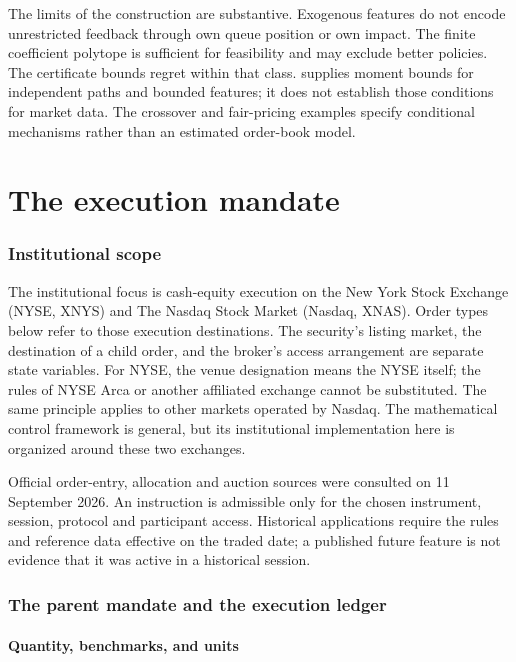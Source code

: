 \documentclass[11pt]{article}
\numberwithin{equation}{section}
\theoremstyle{definition}
\theoremstyle{remark}
\theoremstyle{definition}
\begin{document}
The limits of the construction are substantive. Exogenous features do not
encode unrestricted feedback through own queue position or own impact. The
finite coefficient polytope is sufficient for feasibility and may exclude
better policies. The certificate bounds regret within that class.
 supplies moment bounds for independent paths and
bounded features; it does not establish those conditions for market data.
The crossover and fair-pricing examples specify conditional mechanisms rather
than an estimated order-book model. 

\part{The execution mandate}\label{pt:mandate}
\section{Institutional scope}\label{sec:mandate}

The institutional focus is cash-equity execution on the New York Stock Exchange
(NYSE, XNYS) and The Nasdaq Stock Market (Nasdaq, XNAS). Order types below refer
to those execution destinations. The security's listing market, the destination
of a child order, and the broker's access arrangement are separate state
variables. For NYSE, the venue designation means the NYSE itself; the rules of
NYSE Arca or another affiliated exchange cannot be substituted. The same
principle applies to other markets operated by Nasdaq. The mathematical control
framework is general, but its institutional implementation here is organized
around these two exchanges.

Official order-entry, allocation and auction sources were consulted on
11 September 2026. An instruction is admissible only for the chosen instrument,
session, protocol and participant access. Historical applications require the
rules and reference data effective on the traded date; a published future
feature is not evidence that it was active in a historical session.

\section{The parent mandate and the execution ledger}\label{sec:ledger}

\subsection{Quantity, benchmarks, and units}
\end{document}
